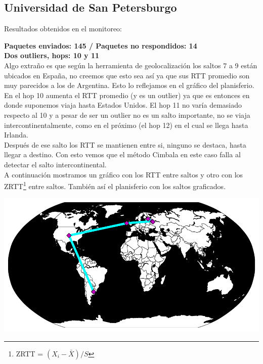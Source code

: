\subsection{Universidad de San Petersburgo}

Resultados obtenidos en el monitoreo:\\

\smallskip

\bigskip

\textbf{Paquetes enviados: 145 / Paquetes no respondidos: 14}\\

\textbf{Dos outliers, hops: 10 y 11}\\

Algo extraño es que según la herramienta de geolocalización los saltos 7 a 9 están ubicados en España, no creemos que esto sea así ya que sus RTT promedio son muy parecidos a los de Argentina. Esto lo reflejamos en el gráfico del planisferio.\\

En el hop 10 aumenta el RTT promedio (y es un outlier) ya que es entonces en donde suponemos viaja hasta Estados Unidos. El hop 11 no varía demasiado respecto al 10 y a pesar de ser un outlier no es un salto importante, no se viaja intercontinentalmente, como en el próximo (el hop 12) en el cual se llega hasta Irlanda.\\

Después de ese salto los RTT se mantienen entre si, ninguno se destaca, hasta llegar a destino. Con esto vemos que el método Cimbala en este caso falla al detectar el salto intercontinental.\\

A continuación mostramos un gráfico con los RTT entre saltos y otro con los ZRTT\footnote{ZRTT = $(X_i - \bar{X}) / S$}  entre saltos. También así el planisferio con los saltos graficados.

\begin{center}
\includegraphics[scale=0.8]{imagenes/rusia/rusia.pdf} 
\end{center}
